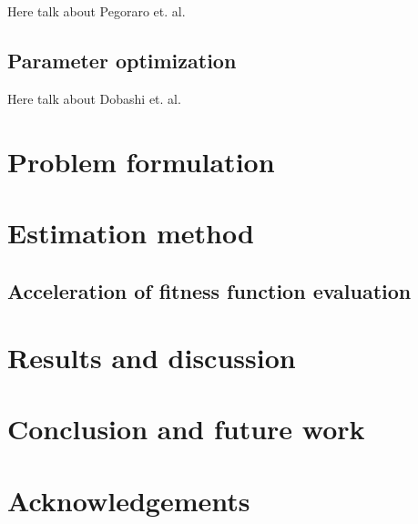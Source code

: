 \documentclass{acmsiggraph}
\begin{document}
Here talk about Pegoraro et. al.

\subsection{Parameter optimization}

Here talk about Dobashi et. al.


\section{Problem formulation}

\section{Estimation method}

\subsection{Acceleration of fitness function evaluation}

\section{Results and discussion}

\section{Conclusion and future work}

\section*{Acknowledgements}


\nocite{*}

\end{document}
